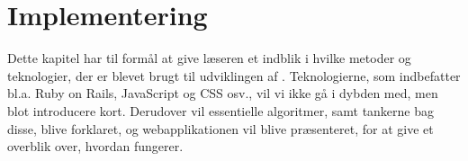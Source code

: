\chapter{Implementering}
\label{chap:implementering}

Dette kapitel har til formål at give læseren et indblik i hvilke metoder og teknologier, der er blevet brugt til udviklingen af \Foodl. Teknologierne, som indbefatter bl.a. Ruby on Rails, JavaScript og CSS osv., vil vi ikke gå i dybden med, men blot introducere kort. Derudover vil essentielle algoritmer, samt tankerne bag disse, blive forklaret, og webapplikationen vil blive præsenteret, for at give et overblik over, hvordan {\Foodl} fungerer. 





